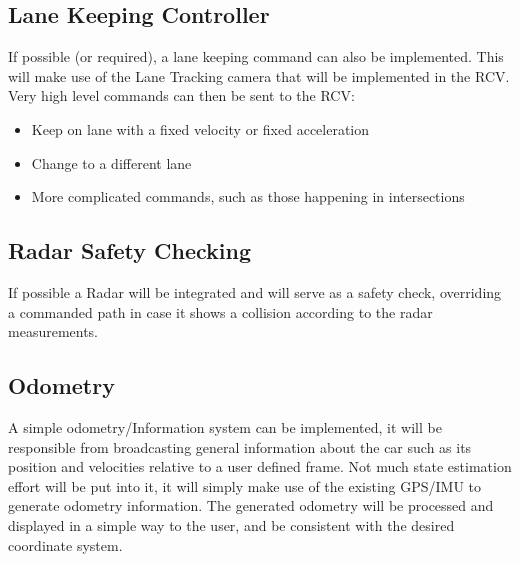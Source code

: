 \documentclass{article}
\begin{document}
\subsection{Lane Keeping Controller}

If possible (or required), a lane keeping command can also be implemented. This will make use of the Lane Tracking camera that will be implemented in the RCV. Very high level commands can then be sent to the RCV:

\begin{itemize}
\item Keep on lane with a fixed velocity or fixed acceleration
\item Change to a different lane
\item More complicated commands, such as those happening in intersections
\end{itemize}
	
%		
%	
%
%
%

\subsection{Radar Safety Checking}

If possible a Radar will be integrated and will serve as a safety check, overriding a commanded path in case it shows a collision according to the radar measurements.

\subsection{Odometry}

A simple odometry/Information system can be implemented, it will be responsible from broadcasting general information about the car such as its position and velocities relative to a user defined frame.
Not much state estimation effort will be put into it, it will simply make use of the existing GPS/IMU to generate odometry information. 
The generated odometry will be processed and displayed in a simple way to the user, and be consistent with the desired coordinate system.
\end{document}
